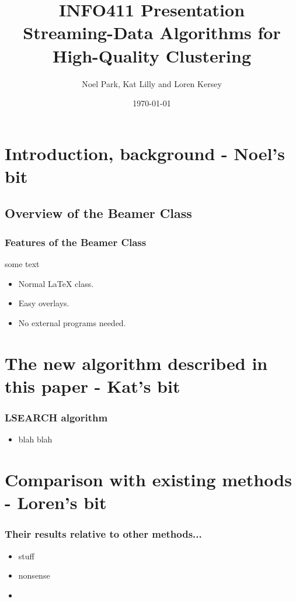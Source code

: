 \documentclass{beamer}
\title{INFO411 Presentation \\ Streaming-Data Algorithms for High-Quality Clustering}
\author{Noel Park, Kat Lilly and Loren Kersey}
\date{\today}
\begin{document}
\frame{\titlepage}

\section[Outline]{}
\frame{\tableofcontents}

\section{Introduction, background - Noel's bit}
\subsection{Overview of the Beamer Class}
\frame
{
  \frametitle{Features of the Beamer Class}

  some text
  
  \begin{itemize}
  \item Normal LaTeX class.
  \item Easy overlays.
  \item No external programs needed.      
  \end{itemize}
}

\section{The new algorithm described in this paper - Kat's bit}
\frame
{
  \frametitle{LSEARCH algorithm}

  \begin{itemize}
  \item  blah blah
  \end{itemize}
}


\section{Comparison with existing methods - Loren's bit}
\frame
{
  \frametitle{Their results relative to other methods...}

  \begin{itemize}
  \item stuff
  \item nonsense
  \item      
  \end{itemize}
}
\end{document}

